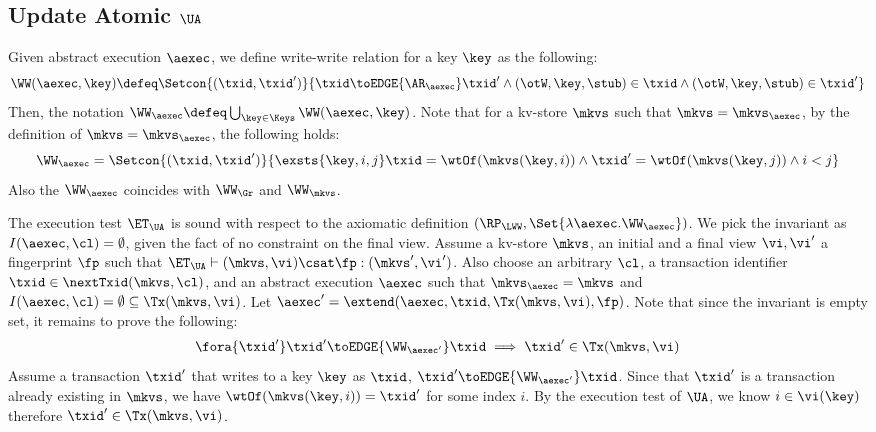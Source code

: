 \subsection{Update Atomic \( \UA \)}
\label{sec:sound-complete-ua}

Given abstract execution \( \aexec \), we define write-write relation for a key \( \key \) as the following:
\[ 
    \WW(\aexec,\key) \defeq \Setcon{(\txid, \txid')}{\txid \toEDGE{\AR_\aexec} \txid' \land (\otW,\key, \stub ) \in \txid \land (\otW,\key, \stub ) \in \txid'  } 
\]
Then, the notation \( \WW_\aexec \defeq \bigcup_{\key \in \Keys} \WW(\aexec, \key) \).
Note that for a kv-store \( \mkvs \) such that \( \mkvs = \mkvs_\aexec \),
by the definition of  \(  \mkvs = \mkvs_\aexec \), 
the following holds:
\[
    \WW_\aexec = \Setcon{(\txid, \txid')}{\exsts{\key, i,j } \txid = \wtOf(\mkvs(\key, i)) \land \txid' = \wtOf(\mkvs(\key, j)) \land i < j}
\]
Also the \( \WW_\aexec \) coincides with \( \WW_\Gr \) and \( \WW_\mkvs \).

The execution test $\ET_\UA$ is sound with respect to the axiomatic definition \( (\RP_{\LWW}, \Set{\lambda \aexec. \WW_\aexec }) \).
We pick the invariant as \( I( \aexec, \cl ) = \emptyset \), given the fact of no constraint on the final view.
Assume a kv-store $\mkvs$, an initial and a final view $\vi, \vi'$  a fingerprint $\fp$ 
such that $\ET_{\UA} \vdash (\mkvs, \vi) \csat \fp: (\mkvs', \vi')$. 
Also choose an arbitrary $\cl$, a transaction identifier $\txid \in \nextTxid(\mkvs, \cl)$, 
and an abstract execution $\aexec$ such that $\mkvs_{\aexec} = \mkvs$ and 
\( I(\aexec, \cl) =  \emptyset \subseteq \Tx(\mkvs, \vi) \).
Let \( \aexec' = \extend(\aexec, \txid, \Tx(\mkvs, \vi), \fp ) \).
Note that since the invariant is empty set, it remains to prove the following:
\[
    \begin{array}{@{}l@{}}
        \fora{ \txid' } \txid' \toEDGE{\WW_{\aexec'}} \txid \implies \txid' \in \Tx(\mkvs, \vi)
    \end{array}
\]
Assume a transaction \( \txid' \) that writes to a key \( \key \) as \( \txid \), \ie \( \txid' \toEDGE{\WW_{\aexec'}} \txid \).
Since that \( \txid' \) is a transaction already existing in \( \mkvs\),
we have \( \wtOf(\mkvs(\key, i)) = \txid' \) for some index \( i \).
By the execution test of \( \UA \), we know \( i \in \vi(\key) \) therefore \( \txid' \in \Tx(\mkvs, \vi) \).

